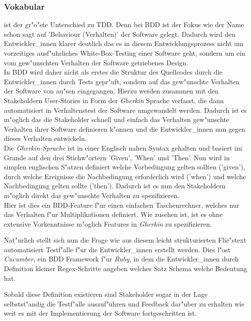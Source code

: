     \subsubsection{Vokabular}
      ist der gr"o"ste Unterschied zu TDD. Denn bei BDD
      ist der Fokus wie der Name schon sagt auf 'Behaviour (Verhalten)' der 
      Software gelegt. Dadurch wird den Entwickler\_innen klarer deutlich
      das es in diesem Entwicklungsprozess nicht um vorzeitiges ausf"uhrliches
      White-Box-Testing einer Software geht, sondern um ein vom gew"unschten 
      Verhalten der Software getriebenes Design.\\
      In BDD wird daher nicht als erstes die Struktur des Quellcodes durch die 
      Entwickler\_innen durch Tests gepr"uft, sondern auf das gew"unschte
      Verhalten der Software von au"sen eingegangen. Hierzu werden zusammen
      mit den Stakeholdern User-Stories in Form der {\em Gherkin}\cite{Gherkin} Sprache verfasst, die
      dann automatisiert in Verhaltenstest der Software umgewandelt werden.
      Dadurch ist es m"oglich das die Stakeholder schnell und einfach das 
      Verhalten gew"unschte Verhalten ihrer Software definieren k"onnen und
      die Entwickler\_innen nun gegen dieses Verhalten entwickeln.\\
      Die {\em Gherkin-Sprache} ist in einer Englisch nahen Syntax 
      gehalten und basiert im Grunde auf den drei Stichw"ortern 'Given', 'When' 
      und 'Then'. Nun wird in simplen englischen S"atzen definiert welche 
      Vorbedingung gelten sollten ('given'), durch welche Ereignisse die 
      Nachbedingung erforderlich wird ('when') und welche Nachbedingung gelten
      sollte ('then'). Dadurch ist es nun den Stakeholdern m"oglich direkt 
      das gew"unschte Verhalten zu spezifizieren.\\
      Hier ist dies ein BDD-Feature f"ur einen einfachen Taschenrechner, welches
      nur das Verhalten f"ur Multiplikationen definiert. Wie zusehen ist, ist 
      es ohne extensive Vorkenntnisse m"oglich Features in {\em Gherkin} zu spezifizieren.
      
      Nat"urlich stellt sich nun die Frage wie aus diesem leicht strukturierten
      Flie"stext automatisiert Testf"alle f"ur die Entwickler\_innen erstellt werden.
      Dies l"ost {\em Cucumber}\cite{Cucumber}, ein BDD Framework f"ur {\em Ruby}, in dem die Entwickler\_innen durch Definition kleiner Regex-Schritte angeben 
      welches Satz Schema welche Bedeutung hat.
      
      Sobald diese Definition existieren sind Stakeholder sogar in der Lage
      selbstst"andig die Testf"alle auszuf"uhren und Feedback dar"uber zu 
      erhalten wie weit es mit der Implementierung der Software fortgeschritten
      ist.\\\\

